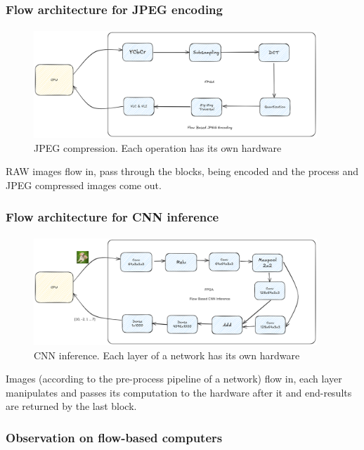 \documentclass{beamer}
\begin{document}
{\begin{frame}[fragile]
  \frametitle{Flow architecture for JPEG encoding}
  \framesubtitle{}
  \begin{figure}
    \centering
    \includegraphics[width=0.95\textwidth]{flowjpeg.png}
    \caption{JPEG compression. Each operation has its own hardware}
    \label{}
  \end{figure}

  RAW images flow in, pass through the blocks, being encoded
  and the process and JPEG compressed images come out.
\end{frame}

\begin{frame}[fragile]
  \frametitle{Flow architecture for CNN inference}
  \framesubtitle{}
  \begin{figure}
    \centering
    \includegraphics[width=0.95\textwidth]{flowcnn.png}
    \caption{CNN inference. Each layer of a network has its own hardware}
    \label{}
  \end{figure}

  Images (according to the pre-process pipeline of a network) flow
  in, each layer manipulates and passes its computation to the
  hardware after it and end-results are returned by the last
  block.
\end{frame}

\begin{frame}[fragile]
  \frametitle{Observation on flow-based computers}
  \framesubtitle{}
  \begin{enumerate}
      

\end{enumerate}
\end{frame}}
\end{document}
